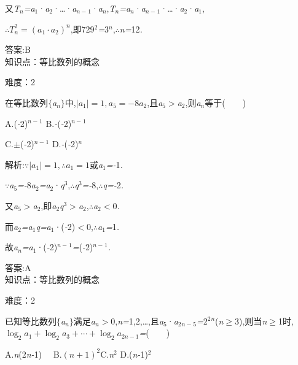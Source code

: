 \documentclass{article} %
\begin{document}
又\textit{T${}_{n}$=a}${}_{1}$·\textit{a}${}_{2}$·{\dots}·\textit{a${}_{n-}$}${}_{1}$·\textit{a${}_{n}$},\textit{T${}_{n}$=a${}_{n}$}·\textit{a${}_{n-}$}${}_{1}$·{\dots}·\textit{a}${}_{2}$·\textit{a}${}_{1}$,

$\therefore T_n^2=(a_1\cdot a_2)^n$,即729${}^{2}$\textit{=}3\textit{${}^{n}$},\textit{$\therefore$n=}12\textit{.}

 答案:B \\

知识点：等比数列的概念

难度：2

 在等比数列$\mathrm{\{}$\textit{a${}_{n}$}$\mathrm{\}}$中,$|a_1|=1,a_5=-8a_2$,且\textit{a}${}_{5}$\textit{$>$a}${}_{2}$,则\textit{a${}_{n}$}等于(\textit{　　})

 A.(\textit{-}2)\textit{${}^{n-}$}${}^{1}$ B.\textit{-}(\textit{-}2)\textit{${}^{n-}$}${}^{1}$

 C.\textit{$\pm$}(\textit{-}2)\textit{${}^{n-}$}${}^{1}$ D.\textit{-}(\textit{-}2)\textit{${}^{n}$}

 解析:$\because |a_1|=1,\therefore a_1=1$或\textit{a}${}_{1}$\textit{=-}1\textit{.}

\textit{$\because$a}${}_{5}$\textit{=-}8\textit{a}${}_{2}$\textit{=a}${}_{2}$·\textit{q}${}^{3}$,\textit{$\therefore$q}${}^{3}$\textit{=-}8,\textit{$\therefore$q=-}2\textit{.}

又\textit{a}${}_{5}$\textit{$>$a}${}_{2}$,即\textit{a}${}_{2}$\textit{q}${}^{3}$\textit{$>$a}${}_{2}$,\textit{$\therefore$a}${}_{2}$\textit{$<$}0\textit{.}

而\textit{a}${}_{2}$\textit{=a}${}_{1}$\textit{q=a}${}_{1}$·(\textit{-}2)\textit{$<$}0,\textit{$\therefore$a}${}_{1}$\textit{=}1\textit{.}

故\textit{a${}_{n}$=a}${}_{1}$·(\textit{-}2)\textit{${}^{n-}$}${}^{1}$\textit{=}(\textit{-}2)\textit{${}^{n-}$}${}^{1}$\textit{.}

 答案:A \\

知识点：等比数列的概念

难度：2

 已知等比数列$\mathrm{\{}$\textit{a${}_{n}$}$\mathrm{\}}$满足\textit{a${}_{n}$$>$}0,\textit{n=}1,2,{\dots},且\textit{a}${}_{5}$·\textit{a}${}_{2}$\textit{${}_{n-}$}${}_{5}$\textit{=}2${}^{2}$\textit{${}^{n}$}(\textit{n}$\mathrm{\ge}$3),则当\textit{n}$\mathrm{\ge}$1时,$\log_2a_1+\log_2a_3+\cdots +\log_2a_{2n-1}$\textit{=}(\textit{　　})

 A.\textit{n}(2\textit{n-}1) \textit{　}B.$(n+1)^2$C.\textit{n}${}^{2}$ D.(\textit{n-}1)${}^{2}$
\end{document}
